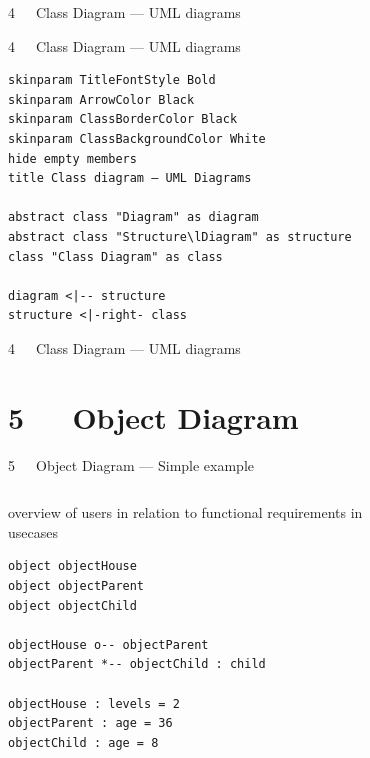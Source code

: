 \documentclass{beamer}
\begin{document}
\begin{frame}{4~~~Class Diagram — UML diagrams}
\begin{figure}
\def\centering\svgwidth{\textwidth}
\resizebox{!}{.55\textheight}{}
\end{figure}
\end{frame}

\begin{frame}[fragile]{4~~~Class Diagram — UML diagrams}
\begin{verbatim}
skinparam TitleFontStyle Bold
skinparam ArrowColor Black
skinparam ClassBorderColor Black
skinparam ClassBackgroundColor White
hide empty members
title Class diagram — UML Diagrams

abstract class "Diagram" as diagram
abstract class "Structure\lDiagram" as structure
class "Class Diagram" as class

diagram <|-- structure
structure <|-right- class
\end{verbatim}
\end{frame}

\begin{frame}{4~~~Class Diagram — UML diagrams}
\begin{figure}
\def\centering\svgwidth{\textwidth}
\resizebox{\textwidth}{!}{}
\end{figure} 
\end{frame}



\section{5~~~Object Diagram}

\begin{frame}[fragile]{5~~~Object Diagram — Simple example}
\begin{columns}
\begin{column}{.6\textwidth}
overview of \alert{users} in relation to functional requirements in \alert{usecases}
\begin{verbatim}
object objectHouse
object objectParent
object objectChild

objectHouse o-- objectParent
objectParent *-- objectChild : child

objectHouse : levels = 2
objectParent : age = 36
objectChild : age = 8
\end{verbatim}
\end{column}
\begin{column}{.4\textwidth}
\begin{figure}
\def\centering\svgwidth{\columnwidth}
\resizebox{!}{.65\textheight}{}
\end{figure}
\end{column}
\end{columns}
\end{frame}
\end{document}
